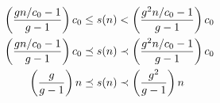 \begin{align*}
\left( \frac{g{n} / c_0 - 1}{g - 1} \right) c_0 \leq s(n) &< \left( \frac{g^2{n} / c_0 - 1}{g - 1} \right) c_0\\
\left( \frac{g{n} / c_0 - 1}{g - 1} \right) c_0 \preceq s(n) &\prec \left( \frac{g^2{n} / c_0 - 1}{g - 1} \right) c_0\\
\left( \frac{g}{g - 1} \right) n \preceq s(n) &\prec \left( \frac{g^2}{g - 1} \right) n
\end{align*}